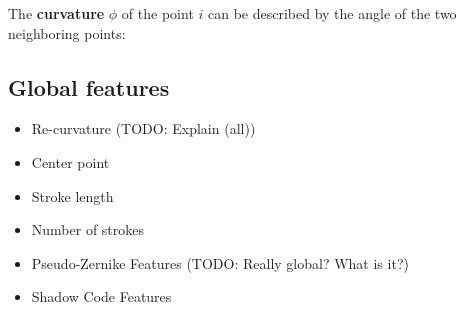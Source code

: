 The \textbf{curvature} $\phi$ of the point $i$ can be described by the
angle of the two neighboring points:


\subsection{Global features}
\begin{itemize}
    \item Re-curvature\cite{Huang06} (TODO: Explain (all))
    \item Center point\cite{Huang06}
    \item Stroke length\cite{Huang06}
    \item Number of strokes\cite{Huang09}
    \item Pseudo-Zernike Features (TODO: Really global? What is it?)\cite{Khotanzad}
    \item Shadow Code Features\cite{Khotanzad}
\end{itemize}